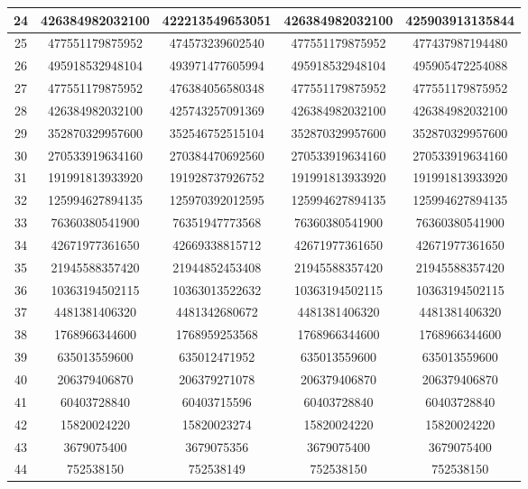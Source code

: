 \documentclass{article}
\begin{document}
\begin{table}[htbp]
\begin{center}
\begin{tabular}{|c||c|c|c|c|}
        24 & 426384982032100 & 422213549653051 & 426384982032100 & 425903913135844 \\ \hline
        25 & 477551179875952 & 474573239602540 & 477551179875952 & 477437987194480 \\ \hline
        26 & 495918532948104 & 493971477605994 & 495918532948104 & 495905472254088 \\ \hline
        27 & 477551179875952 & 476384056580348 & 477551179875952 & 477551179875952 \\ \hline
        28 & 426384982032100 & 425743257091369 & 426384982032100 & 426384982032100 \\ \hline
        29 & 352870329957600 & 352546752515104 & 352870329957600 & 352870329957600 \\ \hline
        30 & 270533919634160 & 270384470692560 & 270533919634160 & 270533919634160 \\ \hline
        31 & 191991813933920 & 191928737926752 & 191991813933920 & 191991813933920 \\ \hline
        32 & 125994627894135 & 125970392012595 & 125994627894135 & 125994627894135 \\ \hline
        33 & 76360380541900 & 76351947773568 & 76360380541900 & 76360380541900 \\ \hline
        34 & 42671977361650 & 42669338815712 & 42671977361650 & 42671977361650 \\ \hline
        35 & 21945588357420 & 21944852453408 & 21945588357420 & 21945588357420 \\ \hline
        36 & 10363194502115 & 10363013522632 & 10363194502115 & 10363194502115 \\ \hline
        37 & 4481381406320 & 4481342680672 & 4481381406320 & 4481381406320 \\ \hline
        38 & 1768966344600 & 1768959253568 & 1768966344600 & 1768966344600 \\ \hline
        39 & 635013559600 & 635012471952 & 635013559600 & 635013559600 \\ \hline
        40 & 206379406870 & 206379271078 & 206379406870 & 206379406870 \\ \hline
        41 & 60403728840 & 60403715596 & 60403728840 & 60403728840 \\ \hline
        42 & 15820024220 & 15820023274 & 15820024220 & 15820024220 \\ \hline
        43 & 3679075400 & 3679075356 & 3679075400 & 3679075400 \\ \hline
        44 & 752538150 & 752538149 & 752538150 & 752538150 \\ \hline

\end{tabular}
\end{center}
\end{table}
\end{document}
